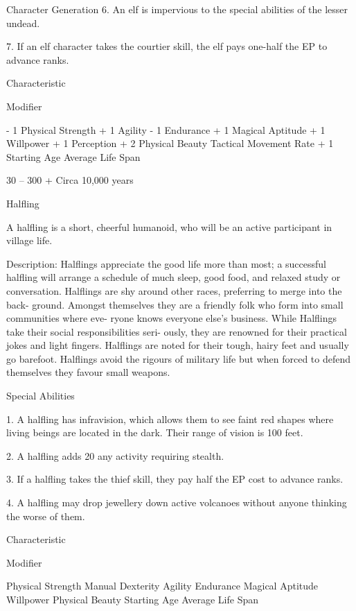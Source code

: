 \begin{Chapter}{Character Generation}
6.  An  elf  is  impervious  to  the  special  abilities  of 
the lesser undead. 

7. If an elf character takes the courtier skill, the elf 
pays one-half the EP to advance ranks. 

Characteristic 

Modifier 

- 1 
Physical Strength 
+ 1 
Agility 
- 1 
Endurance 
+ 1 
Magical Aptitude 
+ 1 
Willpower 
+ 1 
Perception 
+ 2 
Physical Beauty 
Tactical Movement Rate  + 1 
Starting Age 
Average Life Span 

30 – 300 +  
Circa 10,000 years 

Halfling 

A  halfling  is  a  short,  cheerful  humanoid,  who 
will be an active participant in village life. 

Description:  Halflings  appreciate  the  good  life 
more than most; a successful halfling will arrange a 
schedule  of  much  sleep,  good  food,  and  relaxed 
study  or  conversation.  Halflings  are  shy  around 
other  races,  preferring  to  merge  into  the  back-
ground.  Amongst  themselves  they  are  a  friendly 
folk  who form into small communities  where  eve-
ryone  knows  everyone  else’s  business.  While 
Halflings  take  their  social  responsibilities  seri-
ously,  they  are  renowned  for  their  practical  jokes 
and  light  fingers.  Halflings  are  noted  for  their 
tough, hairy feet and usually go barefoot. Halflings 
avoid the rigours of military life but when forced to 
defend themselves they favour small weapons. 

Special Abilities 

1. A halfling has infravision, which allows them to 
see faint red shapes where living beings are located 
in the dark. Their range of vision is 100 feet. 

2. A halfling adds 20%
any activity requiring stealth. 

3.  If  a  halfling  takes  the  thief  skill,  they  pay  half 
the EP cost to advance ranks. 

4.  A  halfling  may  drop  jewellery  down  active 
volcanoes  without  anyone  thinking  the  worse  of 
them. 

Characteristic 

Modifier 

Physical Strength 
Manual Dexterity 
Agility 
Endurance 
Magical Aptitude 
Willpower 
Physical Beauty 
Starting Age 
Average Life Span 


\end{Chapter}
